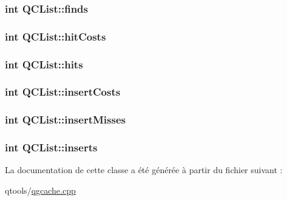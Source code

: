 \subsubsection[{finds}]{\setlength{\rightskip}{0pt plus 5cm}int Q\+C\+List\+::finds}\label{class_q_c_list_a5a2694263c88683048754d331940fd98}
\hypertarget{class_q_c_list_af39b0251f745c302cdcb70f9a673d92a}{}
\subsubsection[{hit\+Costs}]{\setlength{\rightskip}{0pt plus 5cm}int Q\+C\+List\+::hit\+Costs}\label{class_q_c_list_af39b0251f745c302cdcb70f9a673d92a}
\hypertarget{class_q_c_list_ae01f66105a2fde02e0c2d5eb7f2ced92}{}
\subsubsection[{hits}]{\setlength{\rightskip}{0pt plus 5cm}int Q\+C\+List\+::hits}\label{class_q_c_list_ae01f66105a2fde02e0c2d5eb7f2ced92}
\hypertarget{class_q_c_list_abfd6c3fbbceb7f2d63a4bf20c0dfc600}{}
\subsubsection[{insert\+Costs}]{\setlength{\rightskip}{0pt plus 5cm}int Q\+C\+List\+::insert\+Costs}\label{class_q_c_list_abfd6c3fbbceb7f2d63a4bf20c0dfc600}
\hypertarget{class_q_c_list_a9338d57b508b2ba4cdd5c43cde2ecfc2}{}
\subsubsection[{insert\+Misses}]{\setlength{\rightskip}{0pt plus 5cm}int Q\+C\+List\+::insert\+Misses}\label{class_q_c_list_a9338d57b508b2ba4cdd5c43cde2ecfc2}
\hypertarget{class_q_c_list_aacc28ac7151331c5f16b95f9d6806d92}{}
\subsubsection[{inserts}]{\setlength{\rightskip}{0pt plus 5cm}int Q\+C\+List\+::inserts}\label{class_q_c_list_aacc28ac7151331c5f16b95f9d6806d92}


La documentation de cette classe a été générée à partir du fichier suivant \+:\begin{DoxyCompactItemize}
\item 
qtools/\hyperlink{qgcache_8cpp}{qgcache.\+cpp}\end{DoxyCompactItemize}
